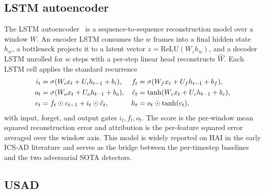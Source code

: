 \subsection{LSTM autoencoder}
\label{sec:det-lstm}

The LSTM autoencoder~\cite{malhotra2016lstm} is a sequence-to-sequence reconstruction model over a window $W$.  An encoder LSTM consumes the $w$ frames into a final hidden state $h_w$, a bottleneck projects it to a latent vector $z = \mathrm{ReLU}(W_z h_w)$, and a decoder LSTM unrolled for $w$ steps with a per-step linear head reconstructs $\widehat{W}$.  Each LSTM cell applies the standard recurrence
\begin{align}
  i_t &= \sigma(W_i x_t + U_i h_{t-1} + b_i), &
  f_t &= \sigma(W_f x_t + U_f h_{t-1} + b_f), \notag\\
  o_t &= \sigma(W_o x_t + U_o h_{t-1} + b_o), &
  \tilde{c}_t &= \tanh(W_c x_t + U_c h_{t-1} + b_c), \\
  c_t &= f_t \odot c_{t-1} + i_t \odot \tilde{c}_t, &
  h_t &= o_t \odot \tanh(c_t), \notag
\end{align}
with input, forget, and output gates $i_t, f_t, o_t$.  The score is the per-window mean squared reconstruction error and attribution is the per-feature squared error averaged over the window axis.  This model is widely reported on HAI in the early ICS-AD literature and serves as the bridge between the per-timestep baselines and the two adversarial SOTA detectors.

\subsection{USAD}
\label{sec:det-usad}

